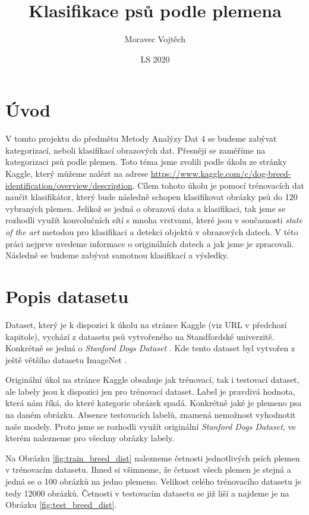 \documentclass[a4paper,12pt]{article}
\author{Moravec Vojtěch}
\title{Klasifikace psů podle plemena}
\date{LS 2020}
\begin{document}
\maketitle
\newpage

\section{Úvod}
V tomto projektu do předmětu Metody Analýzy Dat 4 se budeme zabývat kategorizací, neboli klasifikací obrazových dat.
Přesněji se zaměříme na kategorizaci psů podle plemen. Toto téma jsme zvolili podle úkolu ze stránky Kaggle, 
který můžeme nalézt na adrese \linebreak \url{https://www.kaggle.com/c/dog-breed-identification/overview/description}. 
Cílem tohoto úkolu je pomocí trénovacích dat naučit klasifikátor, který bude následně schopen klasifikovat obrázky psů do 120 vybraných plemen.
Jelikož se jedná o obrazová data a klasifikaci, tak jsme se rozhodli využít konvolučních sítí s mnoha vrstvami, které jsou v současnosti
\emph{state of the art} metodou pro klasifikaci a detekci objektů v obrazových datech. V této práci nejprve uvedeme informace o originálních
datech a jak jsme je zpracovali. Následně se budeme zabývat samotnou klasifikací a výsledky.

\section{Popis datasetu}
Dataset, který je k dispozici k úkolu na stránce Kaggle (viz URL v předchozí kapitole), vychází z datasetu psů vytvořeného na Standfordské univerzitě.
Konkrétně se jedná o \emph{Stanford Dogs Dataset} \cite{KhoslaYaoJayadevaprakashFeiFei_FGVC2011}. Kde tento dataset byl vytvořen z ještě většího datasetu ImageNet \cite{imagenet_cvpr09}.

Originální úkol na stránce Kaggle obsahuje jak trénovací, tak i testovací dataset, ale labely jsou k dispozici jen pro trénovací dataset. Label je pravdivá hodnota, která nám říká, do které kategorie obrázek spadá. Konkrétně jaké je plemeno psa na daném obrázku. Absence testovacích labelů, znamená nemožnost vyhodnotit naše modely. Proto jsme se rozhodli využít originální \emph{Stanford Dogs Dataset}, ve kterém nalezneme pro všechny obrázky labely.

Na Obrázku \ref{fig:train_breed_dist} nalezneme četnosti jednotlivých psích plemen v trénovacím datasetu. Ihned si všimneme, že četnost všech plemen je stejná
a jedná se o 100 obrázků na jedno plemeno. Velikost celého trénovacího datasetu je tedy 12000 obrázků. Četnosti v testovacím datasetu se již liší a najdeme je na Obrázku \ref{fig:test_breed_dist}.
\end{document}
